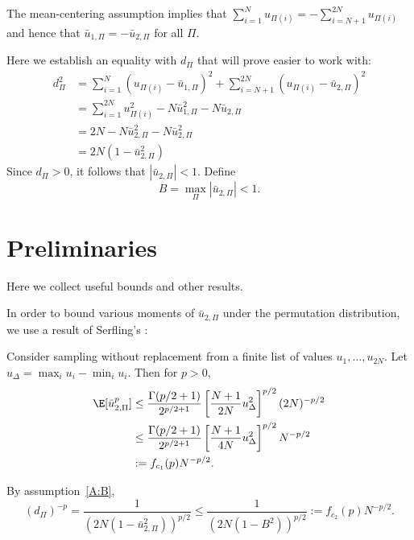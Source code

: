 The mean-centering assumption implies that
$\sum_{i=1}^{N} u_{\Pi(i)} = - \sum_{i=N+1}^{2N} u_{\Pi(i)}$
and hence that $\bar{u}_{1,\Pi} = -\bar{u}_{2,\Pi}$ for all $\Pi$.

Here we establish an equality with $d_{\Pi}$ that will prove easier to work with:
\begin{align*}
  d_\Pi^2 &=  \sum_{i=1}^N(u_{\Pi(i)} - \bar{u}_{1,\Pi})^2 +
  \sum_{i=N+1}^{2N}(u_{\Pi(i)} - \bar{u}_{2,\Pi})^2 \\
  &= \sum_{i=1}^{2N} u_{\Pi(i)}^2 - N \bar{u}_{1,\Pi}^2 - N \bar{u}_{2,\Pi} \\
  &= 2N - N \bar{u}_{2,\Pi}^2 - N \bar{u}_{2,\Pi}^2 \\
  &= 2N(1 - \bar{u}_{2,\Pi}^2)
\end{align*}
Since $d_\Pi > 0$, it follows that $|\bar{u}_{2,\Pi}| < 1$.  Define
\begin{equation}
  \label{A:B}
  B = \max_\Pi |\bar{u}_{2,\Pi}| < 1.
\end{equation}

\section{Preliminaries}
\label{S:stein-proof-preliminaries}
Here we collect useful bounds and other results.

In order to bound various moments of $\bar{u}_{2,\Pi}$ under the
permutation distribution, we use a result of Serfling's
\cite{serfling1974probability}:
\begin{proposition}
  Consider sampling without replacement from a finite list of values
  $u_1, \ldots, u_{2N}$.  Let $u_{\Delta} = \max_i u_{i} - \min_i
  u_{i}$.
  Then for $p > 0$,
  \begin{align}
    \E [\bar{u}_{2,\Pi}^p]
    &\leq \frac{\Gamma(p/2 + 1)}{2^{p/2 + 1}}
    \left [ \frac{N+1}{2N}u_{\Delta}^2 \right ]^{p/2}
    (2N)^{-p/2} \nonumber \\
    &\leq \frac{\Gamma(p/2 + 1)}{2^{p/2 + 1}}
    \left [ \frac{N+1}{4N}u_{\Delta}^2 \right ]^{p/2}
    N^{-p/2} \nonumber \\
    &:= f_{c_1}(p)N^{-p/2} \label{def:serfling}.
  \end{align}
\end{proposition}

By assumption~\eqref{A:B},
\begin{equation}
\label{def:dp}
  (d_{\Pi})^{-p} = \frac{1}{(2N(1-\bar{u}_{2,\Pi}^2))^{p/2}} \leq \frac{1}{(2N(1-B^2))^{p/2}} :=
  f_{c_2}(p) N^{-p/2}.
\end{equation}

